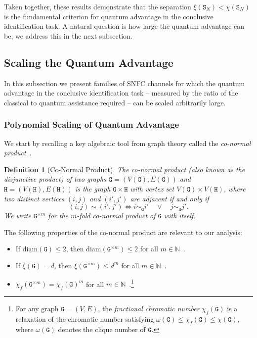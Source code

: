 \documentclass[12pt,a4paper]{article}
\newtheorem{definition}{Definition}
\begin{document}
\noindent Taken together, these results demonstrate that the separation $\xi(\mathtt{S}_N) < \chi(\mathtt{S}_N)$ is the fundamental criterion for quantum advantage in the conclusive identification task. A natural question is how large the quantum advantage can be; we address this in the next subsection.




\subsection{Scaling the Quantum Advantage}

In this subsection we present families of SNFC channels for which the quantum advantage in the conclusive identification task -- measured by the ratio of the classical to quantum assistance required -- can be scaled arbitrarily large. 

\subsubsection{Polynomial Scaling of Quantum Advantage} We start by recalling a key algebraic tool from graph theory called the \emph{co-normal product}~\cite{Feige1997}.

\begin{definition}[Co-Normal Product]\label{def:conormal}
The \emph{co-normal product} (also known as the \emph{disjunctive product}) of two graphs $\mathtt{G} = (V(\mathtt{G}), E(\mathtt{G}))$ and $\mathtt{H} = (V(\mathtt{H}), E(\mathtt{H}))$ is the graph $\mathtt{G} \times \mathtt{H}$ with vertex set $V(\mathtt{G}) \times V(\mathtt{H})$, where two distinct vertices $(i, j)$ and $(i', j')$ are adjacent if and only if
\begin{equation*}
(i,j) \sim (i',j') \iff i \sim_{\mathtt{G}} i' \quad \lor \quad j \sim_{\mathtt{H}} j'.
\end{equation*}
We write $\mathtt{G}^{\times m}$ for the $m$-fold co-normal product of $\mathtt{G}$ with itself.
\end{definition}

\noindent The following properties of the co-normal product are relevant to our analysis:
\begin{itemize}[itemsep=-0.15cm, parsep=0.15cm, 
               topsep=2pt, leftmargin=1.0cm]
\item[\textbf{(P1)}] If $\mathrm{diam}(\mathtt{G}) \leq 2$, then $\mathrm{diam}(\mathtt{G}^{\times m}) \leq 2$ for all $m \in \mathbb{N}$~\cite{Lovasz1979, 
    Hammack2011}.
\item[\textbf{(P2)}] If $\xi(\mathtt{G}) = d$, then $\xi(\mathtt{G}^{\times m}) \leq d^m$ for all $m \in \mathbb{N}$~\cite{Hogben2017}.
\item[\textbf{(P3)}] $\chi_f(\mathtt{G}^{\times m}) = \chi_f(\mathtt{G})^m$ for all $m \in \mathbb{N}$~\cite{Lovasz1979, Scheinerman1997, Hammack2011}.\footnote{For any graph $\mathtt{G} = (V, E)$, the \emph{fractional chromatic number} $\chi_f(\mathtt{G})$ is a relaxation of the chromatic number satisfying $\omega(\mathtt{G}) \leq \chi_f(\mathtt{G}) \leq \chi(\mathtt{G})$, where $\omega(\mathtt{G})$ denotes the clique number of $\mathtt{G}$.}
\end{itemize}
\end{document}
